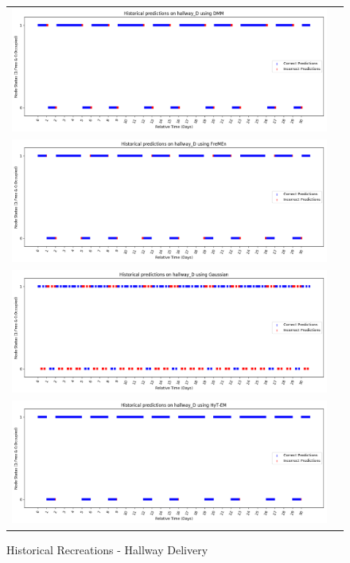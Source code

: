 \begin{center}
\begin{figure}[!Hp]
  \begin{tabular}{cc}
    {\includegraphics[width = 6in]{images/results/Historical_hallway_D_DMM.png}} \\
    {\includegraphics[width = 6in]{images/results/Historical_hallway_D_FreMEn.png}} \\
    {\includegraphics[width = 6in]{images/results/Historical_hallway_D_Gaussian.png}} \\
    {\includegraphics[width = 6in]{images/results/Historical_hallway_D_HyT-EM.png}} \\
  \end{tabular}
  \caption{Historical Recreations - Hallway Delivery}
\end{figure}\\ \\


\end{center}
